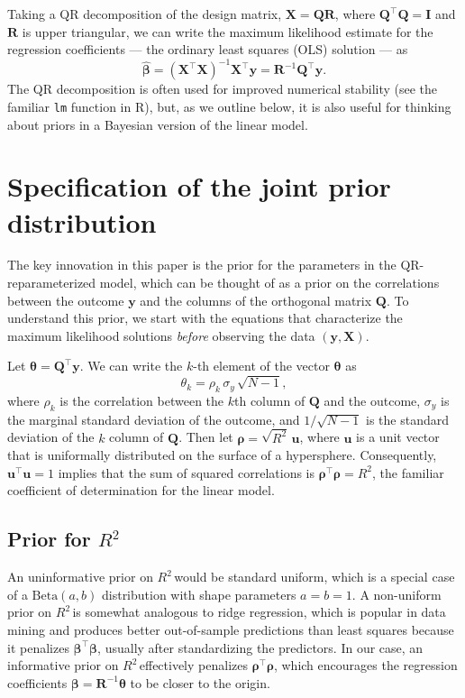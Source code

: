 \documentclass[11pt]{article}
\newcommand{\Rsq}{$R^2\,$}
\newcommand{\boldrho}{\boldsymbol{\rho}}
\newcommand{\boldbeta}{\boldsymbol{\beta}}
\newcommand{\boldtheta}{\boldsymbol{\theta}}
\newcommand{\hatbeta}{\widehat{\boldbeta}}
\newcommand{\X}{\mathbf{X}}
\newcommand{\y}{\mathbf{y}}
\newcommand{\Q}{\mathbf{Q}}
\newcommand{\R}{\mathbf{R}}
\renewcommand{\u}{\mathbf{u}}
\newcommand{\Betadist}[2]{\mathrm{Beta}\left(#1,#2\right)}
\begin{document}
Taking a QR decomposition of the design matrix, $\X = \Q\R$, where $\Q^\top \Q =
\mathbf{I}$ and $\R$ is upper triangular, we can write the maximum likelihood
estimate for the regression coefficients --- the ordinary least squares (OLS)
solution --- as
$$\hatbeta = \left(\X^\top \X \right)^{-1} \X^\top \y = \R^{-1} \Q^\top \y.$$
%
The QR decomposition is often used for improved numerical stability (see the
familiar {\tt lm} function in R), but, as we outline below, it is also useful
for thinking about priors in a Bayesian version of the linear model.


\section{Specification of the joint prior distribution}
\label{sec:priors}

The key innovation in this paper is the prior for the parameters in the
QR-reparameterized model, which can be thought of as a prior on the correlations
between the outcome $\y$ and the columns of the orthogonal matrix $\Q$. To
understand this prior, we start with the equations that characterize the maximum
likelihood solutions \emph{before} observing the data $\left(\y, \X\right)$.

Let $\boldtheta = \Q^\top \y$. We can write the $k$-th element of the vector
$\boldtheta$ as
$$\theta_k = \rho_k \, \sigma_y \, \sqrt{N - 1},$$
where $\rho_k$ is the correlation between the $k$th column of $\Q$ and the
outcome, $\sigma_y$ is the marginal standard deviation of the outcome, and
$1/\sqrt{N-1}$ is the standard deviation of the $k$ column of $\Q$. Then let
$\boldrho = \sqrt{R^2} \, \u$, where $\u$ is a unit vector that is
uniformally distributed on the surface of a hypersphere. Consequently,
$\u^\top \u = 1$ implies that the sum of squared correlations is
$\boldrho^\top \boldrho = R^2$, the familiar coefficient of determination for
the linear model.

\subsection{Prior for \Rsq}
\label{subsec:r2prior}
An uninformative prior on \Rsq would be standard uniform, which is a special
case of a $\Betadist{a}{b}$ distribution with shape parameters $a = b = 1$.
A non-uniform prior on \Rsq is somewhat analogous to ridge
regression, which is popular in data mining and produces better out-of-sample
predictions than least squares because it penalizes $\boldbeta^\top \boldbeta$,
usually after standardizing the predictors. In our case, an informative prior on
\Rsq effectively penalizes $\boldrho^\top \boldrho$, which encourages the
regression coefficients $\boldbeta = \R^{-1} \boldtheta$ to be closer to the
origin.
\end{document}
